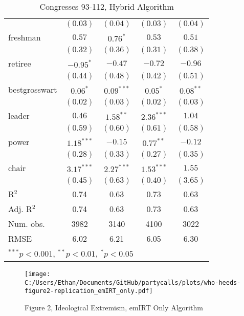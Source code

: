 \documentclass[12pt]{article}
\begin{document}
\begin{table}
\begin{center}
\begin{tabular}{l c c c c }
			& $(0.03)$      & $(0.04)$      & $(0.03)$      & $(0.04)$      \\
			freshman               & $0.57$        & $0.76^{*}$    & $0.53$        & $0.51$        \\
			& $(0.32)$      & $(0.36)$      & $(0.31)$      & $(0.38)$      \\
			retiree                & $-0.95^{*}$   & $-0.47$       & $-0.72$       & $-0.96$       \\
			& $(0.44)$      & $(0.48)$      & $(0.42)$      & $(0.51)$      \\
			bestgrosswart          & $0.06^{*}$    & $0.09^{***}$  & $0.05^{*}$    & $0.08^{**}$   \\
			& $(0.02)$      & $(0.03)$      & $(0.02)$      & $(0.03)$      \\
			leader                 & $0.46$        & $1.58^{**}$   & $2.36^{***}$  & $1.04$        \\
			& $(0.59)$      & $(0.60)$      & $(0.61)$      & $(0.58)$      \\
			power                  & $1.18^{***}$  & $-0.15$       & $0.77^{**}$   & $-0.12$       \\
			& $(0.28)$      & $(0.33)$      & $(0.27)$      & $(0.35)$      \\
			chair                  & $3.17^{***}$  & $2.27^{***}$  & $1.53^{***}$  & $1.55$        \\
			& $(0.45)$      & $(0.63)$      & $(0.40)$      & $(3.65)$      \\
			\hline
			R$^2$                  & 0.74          & 0.63          & 0.73          & 0.63          \\
			Adj. R$^2$             & 0.74          & 0.63          & 0.73          & 0.63          \\
			Num. obs.              & 3982          & 3140          & 4100          & 3022          \\
			RMSE                   & 6.02          & 6.21          & 6.05          & 6.30          \\
			\hline
			\multicolumn{5}{l}{\scriptsize{$^{***}p<0.001$, $^{**}p<0.01$, $^*p<0.05$}}
		\end{tabular}
		\caption{Congresses 93-112, Hybrid Algorithm}
	\end{center}
\end{table}

\begin{figure}[h]
	\caption{Figure 2, Ideological Extremism, emIRT Only Algorithm}
	\centering
	\texttt{[image: C:/Users/Ethan/Documents/GitHub/partycalls/plots/who-heeds-figure2-replication\_emIRT\_only.pdf]}
	
\end{figure}
\end{document}
